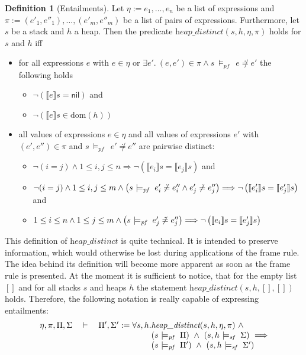 \documentclass{scrartcl}
\theoremstyle{definition}
\newtheorem{definition}{Definition}
\newcommand{\nil}{{\textsf{nil}}}
\newcommand{\pfunequal}[2]{\ensuremath{#1 \not\doteq #2}}
\newcommand{\modelspf}{{\models_{\textit{pf}}\ }}
\newcommand{\modelssf}{{\models_{\textit{sf}}\ }}
\newcommand{\varel}{\eta}
\newcommand{\varepl}{\pi}
\newcommand{\heapdistinct}{\textit{heap\_distinct}}
\newcommand{\entailment}[2]{#1 \quad\vdash\quad #2}
\newcommand{\dom}{{\text{dom}}}
\begin{document}
\begin{definition}[Entailments]
  Let $\varel := e_1, \ldots, e_n$ be a list of expressions and
  $\varepl := (e'_1, e''_1), \ldots, (e'_m, e''_m)$ be a list of pairs of
  expressions. Furthermore, let $s$ be a stack and $h$ a heap. Then the predicate
  $\heapdistinct (s, h, \varel, \varepl)$ holds for $s$ and $h$
  iff
  \begin{itemize}
  \item for all expressions $e$ with $e \in \varel$ or $\exists e'.\ (e, e')
    \in \varepl \wedge s\ \modelspf\ \pfunequal {e} {e'}$ the following holds
    \begin{itemize}
    \item $\neg \left(\llbracket e \rrbracket s = \nil\right)$ and
    \item $\neg \left(\llbracket e \rrbracket s \in \dom(h)\right)$
    \end{itemize}
  \item all values of expressions $e \in \varel$ and all values of
    expressions $e'$ with $(e',e'') \in \varepl$ and $s\ \modelspf\ \pfunequal {e'} {e''}$
    are pairwise distinct:
    \begin{itemize}
    \item $\neg (i = j) \wedge 1 \leq i,j \leq n  \Longrightarrow \neg \left(\llbracket e_i \rrbracket s = \llbracket e_j \rrbracket
        s\right)$ and
    \item $\neg (i = j) \wedge 1 \leq i,j \leq m \wedge \left(s\ \modelspf\ \pfunequal {e'_i} {e''_i} \wedge \pfunequal {e'_j}
      {e''_j}\right) \Longrightarrow \\\neg \left(\llbracket e'_i \rrbracket s
      = \llbracket e'_j \rrbracket s\right)$ and
    \item $1 \leq i \leq n \wedge 1 \leq j \leq m \wedge \left(s\ \modelspf\ \pfunequal {e'_j}
      {e''_j}\right) \Longrightarrow \\\neg \left(\llbracket e_i \rrbracket s = \llbracket e'_j \rrbracket s\right)$
    \end{itemize}
  \end{itemize}

  This definition of $\heapdistinct$ is quite technical. It is intended to
  preserve information, which would otherwise be lost during applications of
  the frame rule. The idea behind its definition will become more
  apparent as soon as the frame rule is presented. At the moment it is
  sufficient to notice, that for the empty list $[]$ and for all stacks $s$
  and heaps $h$ the statement $\heapdistinct (s, h, [], [])$ holds. Therefore,
  the following notation is really capable of expressing entailments:
\[
\setlength{\arraycolsep}{0pt}
\begin{array}{ll}
  \entailment{\varel, \varepl, \Pi, \Sigma}{\Pi', \Sigma'} := \forall s, h.&
  \heapdistinct(s, h, \varel, \varepl)\ \wedge \\
  &\left(s\ \modelspf\ \Pi\right)\ \wedge\
\left(s,h\ \modelssf\ \Sigma\right)\ \Longrightarrow \\
&\left(s\ \modelspf\ \Pi'\right)\ \wedge\ \left(s,h\ \modelssf\ \Sigma'\right)
\end{array}
\]
\end{definition}
\end{document}
